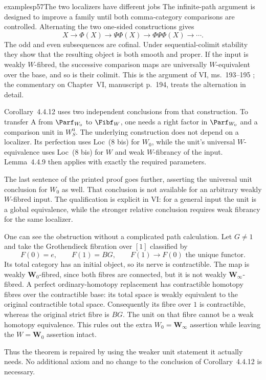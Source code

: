 \begin{dcomment}{examples}{p57}{The two localizers have different jobs}
The infinite-path argument is designed to improve a family until both comma-category comparisons are controlled. Alternating the two one-sided constructions gives
\[
 X\longrightarrow\Phi(X)\longrightarrow\Psi\Phi(X)
 \longrightarrow\Phi\Psi\Phi(X)\longrightarrow\cdots.
\]
The odd and even subsequences are cofinal. Under sequential-colimit stability they show that the resulting object is both smooth and proper. If the input is weakly $W$-fibred, the successive comparison maps are universally $W$-equivalent over the base, and so is their colimit. This is the argument of VI, ms.~193--195 \citep{Grothendieck1990VI}; the commentary on Chapter~VI, manuscript p.~194, treats the alternation in detail.

Corollary~4.4.12 uses two independent conclusions from that construction. To transfer A from $\Parf_{W_0}$ to $\Fibf_W$, one needs a right factor in $\Parf_{W_0}$ and a comparison unit in $W_S^{\mathrm u}$. The underlying construction does not depend on a localizer. Its perfection uses Loc~(8 bis) for $W_0$, while the unit's universal $W$-equivalence uses Loc~(8 bis) for $W$ and weak $W$-fibrancy of the input. Lemma~4.4.9 then applies with exactly the required parameters.

The last sentence of the printed proof goes further, asserting the universal unit conclusion for $W_0$ as well. That conclusion is not available for an arbitrary weakly $W$-fibred input. The qualification is explicit in VI: for a general input the unit is a global equivalence, while the stronger relative conclusion requires weak fibrancy for the same localizer.

One can see the obstruction without a complicated path calculation. Let $G\ne1$ and take the Grothendieck fibration over $[1]$ classified by
\[
 F(0)=e,\qquad F(1)=BG,\qquad F(1)\longrightarrow F(0)
 \text{ the unique functor}.
\]
Its total category has an initial object, so its nerve is contractible. The map is weakly $\mathbf W_0$-fibred, since both fibres are connected, but it is not weakly $\mathbf W_\infty$-fibred. A perfect ordinary-homotopy replacement has contractible homotopy fibres over the contractible base: its total space is weakly equivalent to the original contractible total space. Consequently its fibre over $1$ is contractible, whereas the original strict fibre is $BG$. The unit on that fibre cannot be a weak homotopy equivalence. This rules out the extra $W_0=\mathbf W_\infty$ assertion while leaving the $W=\mathbf W_0$ assertion intact.

Thus the theorem is repaired by using the weaker unit statement it actually needs. No additional axiom and no change to the conclusion of Corollary~4.4.12 is necessary.
\end{dcomment}

